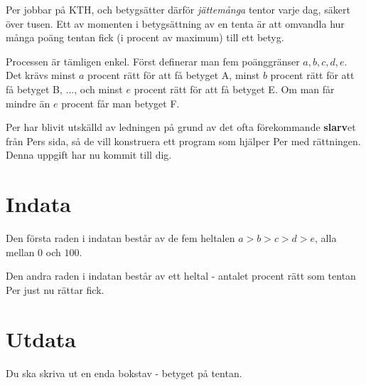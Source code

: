 
Per jobbar på KTH, och betygsätter därför \emph{jättemånga} tentor varje dag, säkert över tusen. Ett av momenten i betygsättning av en tenta är att omvandla hur många poäng tentan fick (i procent av maximum) till ett betyg.

Processen är tämligen enkel. Först definerar man fem poänggränser $a, b, c, d, e$. Det krävs minst $a$ procent rätt för att få betyget A, minst $b$ procent rätt för att få betyget B, ..., och minst $e$ procent rätt för att få betyget E. Om man får mindre än $e$ procent får man betyget F.

Per har blivit utskälld av ledningen på grund av det ofta förekommande \textbf{slarv}et från Pers sida, så de vill konstruera ett program som hjälper Per med rättningen. Denna uppgift har nu kommit till dig.

\section*{Indata}

Den första raden i indatan består av de fem heltalen $a > b > c > d > e$, alla mellan $0$ och $100$.

Den andra raden i indatan består av ett heltal - antalet procent rätt som tentan Per just nu rättar fick.

\section*{Utdata}

Du ska skriva ut en enda bokstav - betyget på tentan.
